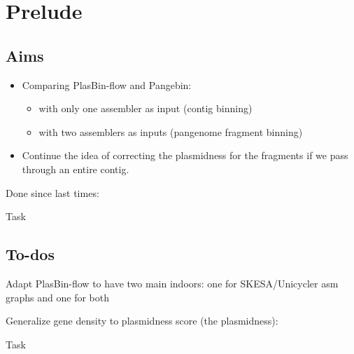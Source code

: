 \section*{Prelude}\label{sec:prelude}

\subsection*{Aims}\label{sec:prelude:aims}

\begin{itemize}
  \item Comparing PlasBin-flow and Pangebin:
    \begin{itemize}
      \item with only one assembler as input (contig binning)
      \item with two assemblers as inputs (pangenome fragment binning)
    \end{itemize}
  \item Continue the idea of correcting the plasmidness for the fragments if we pass through an entire contig.
\end{itemize}

\begin{newfeatbox}
  Done since last times:

  \begin{CheckList}{Task}
  \end{CheckList}
\end{newfeatbox}

\subsection*{To-dos}\label{sec:prelude:to-dos}

\begin{todobox}
  Adapt PlasBin-flow to have two main indoors: one for SKESA/Unicycler asm graphs and one for both
\end{todobox}

\begin{todobox}
  Generalize gene density to plasmidness score (the plasmidness):

  \begin{CheckList}{Task}
  \end{CheckList}
\end{todobox}